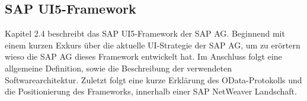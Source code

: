 %
%    


\subsection{SAP UI5-Framework}
Kapitel 2.4 beschreibt das SAP UI5-Framework der SAP AG. Beginnend mit einem kurzen Exkurs über die aktuelle UI-Strategie der SAP AG, um zu erörtern wieso die SAP AG dieses Framework entwickelt hat. Im Anschluss folgt eine allgemeine Definition, sowie die Beschreibung der verwendeten Softwarearchitektur. Zuletzt folgt eine kurze Erklärung des OData-Protokolls und die Positionierung des Frameworks, innerhalb einer SAP NetWeaver Landschaft.

